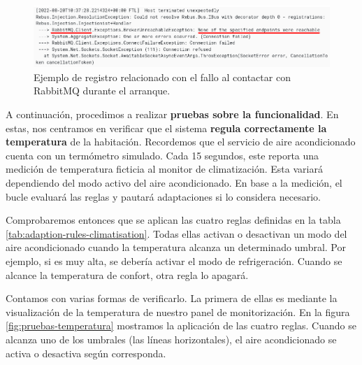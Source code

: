 \begin{figure}[htb]
  \centering
  \includegraphics[scale=0.45]{cap_despliegue/images/Logs-fallo-RabbitMQ}
  \caption{Ejemplo de registro relacionado con el fallo al contactar con RabbitMQ durante el arranque.}
  \label{fig:prueba-logs-error-rabbitmq}
\end{figure}

A continuación, procedimos a realizar \textbf{pruebas sobre la funcionalidad}. En estas, nos centramos en verificar que el sistema \textbf{regula correctamente la temperatura} de la habitación. Recordemos que el servicio de aire acondicionado cuenta con un termómetro simulado. Cada 15 segundos, este reporta una medición de temperatura ficticia al monitor de climatización. Esta variará dependiendo del modo activo del aire acondicionado. En base a la medición, el bucle evaluará las reglas y pautará adaptaciones si lo considera necesario.

Comprobaremos entonces que se aplican las cuatro reglas definidas en la tabla \ref{tab:adaption-rules-climatisation}. Todas ellas activan o desactivan un modo del aire acondicionado cuando la temperatura alcanza un determinado umbral. Por ejemplo, si es muy alta, se debería activar el modo de refrigeración. Cuando se alcance la temperatura de confort, otra regla lo apagará.

Contamos con varias formas de verificarlo. La primera de ellas es mediante la visualización de la temperatura de nuestro panel de monitorización. En la figura \ref{fig:pruebas-temperatura} mostramos la aplicación de las cuatro reglas. Cuando se alcanza uno de los umbrales (las líneas horizontales), el aire acondicionado se activa o desactiva según corresponda.

